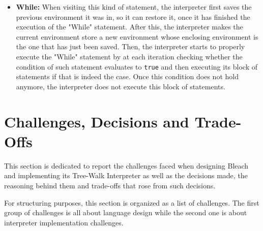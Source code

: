 \begin{itemize}
    \item \textbf{While:} When visiting this kind of statement, the interpreter first saves the previous environment it was in, so it can restore it, once it has finished the execution of the "While" statement. After this, the interpreter makes the current environment store a new environment whose enclosing environment is the one that has just been saved. Then, the interpreter starts to properly execute the "While" statement by at each iteration checking whether the condition of such statement evaluates to \texttt{true} and then executing its block of statements if that is indeed the case. Once this condition does not hold anymore, the interpreter does not execute this block of statements.

\end{itemize}

\section{Challenges, Decisions and Trade-Offs}
This section is dedicated to report the challenges faced when designing Bleach and implementing its Tree-Walk Interpreter as well as the decisions made, the reasoning behind them and trade-offs that rose from such decisions.

For structuring purposes, this section is organized as a list of challenges. The first group of challenges is all about language design while the second one is about interpreter implementation challenges.

